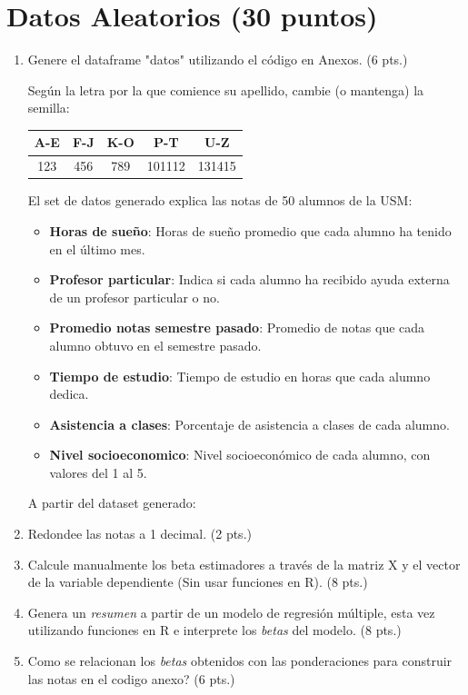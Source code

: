 \documentclass[letterpaper,11pt]{article}
\begin{document}
\section{Datos Aleatorios (30 puntos)}
\begin{enumerate}
    \item Genere el dataframe "datos" utilizando el código en Anexos. (6 pts.)

Según la letra por la que comience su apellido, cambie (o mantenga) la semilla:

\begin{table}[htbp]
\centering
\begin{tabular}{|c|c|c|c|c|}
\hline
\textbf{A-E} & \textbf{F-J} & \textbf{K-O} & \textbf{P-T} & \textbf{U-Z} \\
\hline
123 & 456 & 789 & 101112 & 131415 \\
\hline
\end{tabular}
\label{tabla:division-alfabeto}
\end{table}

El set de datos generado explica las notas de 50 alumnos de la USM:

\begin{itemize}
    \item \textbf{Horas de sueño}: Horas de sueño promedio que cada alumno ha tenido en el último mes.
    \item \textbf{Profesor particular}: Indica si cada alumno ha recibido ayuda externa de un profesor particular o no.
    \item \textbf{Promedio notas semestre pasado}: Promedio de notas que cada alumno obtuvo en el semestre pasado.
    \item \textbf{Tiempo de estudio}: Tiempo de estudio en horas que cada alumno dedica.
    \item \textbf{Asistencia a clases}: Porcentaje de asistencia a clases de cada alumno.
    \item \textbf{Nivel socioeconomico}: Nivel socioeconómico de cada alumno, con valores del 1 al 5.
\end{itemize}

A partir del dataset generado:
    \item Redondee las notas a 1 decimal. (2 pts.)



    \item Calcule manualmente los beta estimadores a través de la matriz X y el vector de la variable dependiente (Sin usar funciones en R). (8 pts.)




    \item Genera un \textit{resumen} a partir de un modelo de regresión múltiple, esta vez utilizando funciones en R e interprete los \textit{betas} del modelo. (8 pts.)


        \item \textquestiondown Como se relacionan los \textit{betas} obtenidos con las ponderaciones para construir las notas en el codigo anexo? (6 pts.)
        


    
\end{enumerate}
\end{document}
